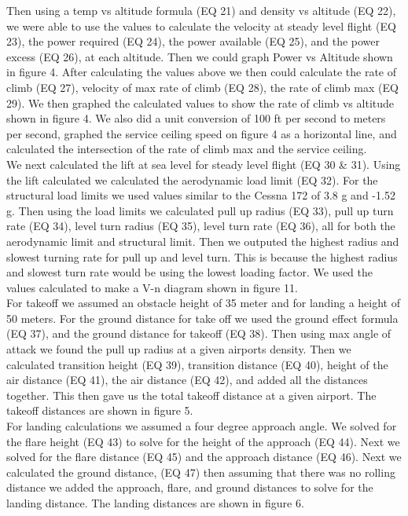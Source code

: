 \documentclass[12pt,A4paper]{article}
\begin{document}
	\indent Then using a temp vs altitude formula (EQ 21) and density vs altitude (EQ 22), we were able to use the values to calculate the velocity at steady level flight (EQ 23), the power required (EQ 24), the power available (EQ 25), and the power excess (EQ 26), at each altitude. Then we could graph Power vs Altitude shown in figure 4. After calculating the values above we then could calculate the rate of climb (EQ 27), velocity of max rate of climb (EQ 28), the rate of climb max (EQ 29). We then graphed the calculated values to show the rate of climb vs altitude shown in figure 4. We also did a unit conversion of 100 ft per second to meters per second, graphed the service ceiling speed on figure 4 as a horizontal line, and calculated the intersection of the rate of climb max and the service ceiling. \\
	\indent We next calculated the lift at sea level for steady level flight (EQ 30 \& 31). Using the lift calculated we calculated the aerodynamic load limit (EQ 32). For the structural load limits we used values similar to the Cessna 172 of 3.8 g and -1.52 g.  Then using the load limits we calculated pull up radius (EQ 33), pull up turn rate (EQ 34), level turn radius (EQ 35), level turn rate (EQ 36), all for both the aerodynamic limit and structural limit. Then we outputed the highest radius and slowest turning rate for pull up and level turn. This is because the highest radius and slowest turn rate would be using the lowest loading factor. We used the values calculated to make a V-n diagram shown in figure 11. \\
	\indent For takeoff we assumed an obstacle height of 35 meter and for landing a height of 50 meters. For the ground distance for take off we used the ground effect formula (EQ 37), and the ground distance for takeoff (EQ 38). Then using max angle of attack we found the pull up radius at a given airports density. Then we calculated transition height (EQ 39), transition distance (EQ 40), height of the air distance (EQ 41), the air distance (EQ 42), and added all the distances together. This then gave us the total takeoff distance at a given airport. The takeoff distances are shown in figure 5. \\
	\indent For landing calculations we assumed a four degree approach angle. We solved for the flare height (EQ 43) to solve for the height of the approach (EQ 44). Next we solved for the flare distance (EQ 45) and the approach distance (EQ 46).  Next we calculated the ground distance, (EQ 47) then assuming that there was no rolling distance we added  the approach, flare, and ground distances to solve for the landing distance. The landing distances are shown in figure 6. \\
	
\end{document}
